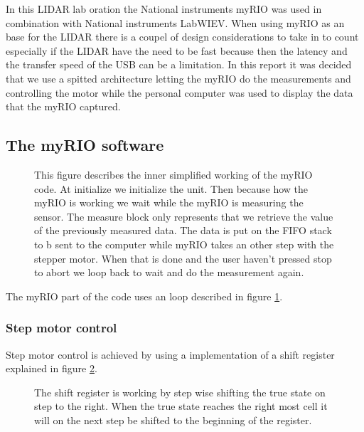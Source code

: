 In this LIDAR lab oration the National instruments myRIO was used in combination with National instruments LabWIEV. 
When using myRIO as an base for the LIDAR there is a coupel of design considerations to take in to count especially if the LIDAR have the need to be fast because then the latency and the transfer speed of the USB can be a limitation. 
In this report it was decided that we use a spitted architecture letting the myRIO do the measurements and controlling the motor while the personal computer was used to display the data that the myRIO captured.
\subsection{The myRIO software}\label{subsection:myRIO}
\begin{figure}[ht]
    
  \caption{This figure describes the inner simplified working of the myRIO code.
  At initialize we initialize the unit. Then because how the myRIO is working we wait while the myRIO is measuring the sensor. The measure block only represents that we retrieve the value of the previously measured data. The data is put on the FIFO stack to b sent to the computer while myRIO takes an other step with the stepper motor. When that is done and the user haven't pressed stop to abort we loop back to wait and do the measurement again.}
  \label{fig:myRIO-loop}
\end{figure}
The myRIO part of the code uses an loop described in figure \ref{fig:myRIO-loop}.
\subsubsection{Step motor control}\label{subsubsection:Step-control}
Step motor control is achieved by using a implementation of a shift register explained in figure \ref{fig:shift-reg}. 
\begin{figure}[ht]
%   
  \caption{The shift register is working by step wise shifting the true state on step to the right. When the true state reaches the right most cell it will on the next step be shifted to the beginning of the register.}
  \label{fig:shift-reg}
\end{figure}